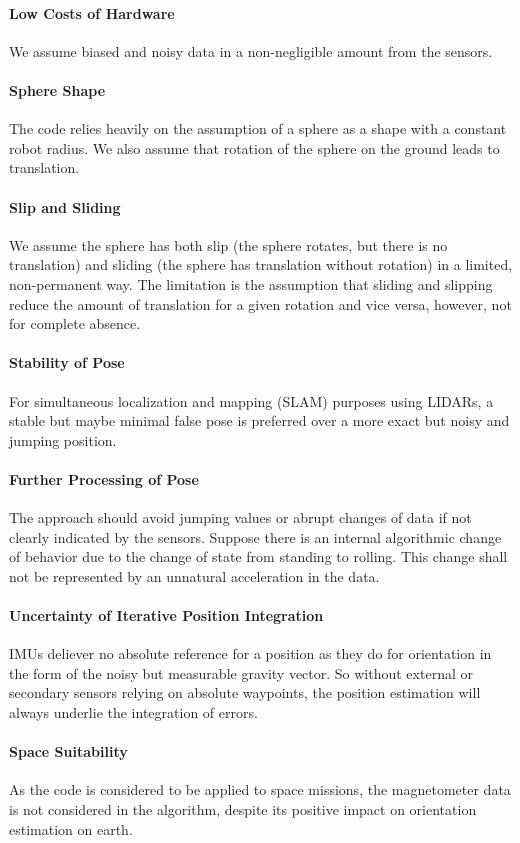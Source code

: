 \documentclass[letterpaper, 10 pt, conference]{ieeeconf}  %
\begin{document}
\paragraph*{Low Costs of Hardware}
We assume biased and noisy data in a non-negligible amount from the sensors.
\paragraph*{Sphere Shape}
The code relies heavily on the assumption of a sphere as a shape with a constant robot radius. We also assume that rotation of the sphere on the ground leads to translation.
\paragraph*{Slip and Sliding}
We assume the sphere has both slip (the sphere rotates, but there is no translation) and sliding (the sphere has translation without rotation) in a limited, non-permanent way. The limitation is the assumption that sliding and slipping reduce the amount of translation for a given rotation and vice versa, however, not for complete absence.
\paragraph*{Stability of Pose}
For simultaneous localization and mapping (SLAM) purposes using LIDARs, a stable but maybe minimal false pose is preferred over a more exact but noisy and jumping position.
\paragraph*{Further Processing of Pose}
The approach should avoid jumping values or abrupt changes of data if not clearly indicated by the sensors. Suppose there is an internal algorithmic change of behavior due to the change of state from standing to rolling. This change shall not be represented by an unnatural acceleration in the data.
\paragraph*{Uncertainty of Iterative Position Integration}
IMUs deliever no absolute reference for a position as they do for orientation in the form of the noisy but measurable gravity vector. So without external or secondary sensors relying on absolute waypoints, the position estimation will always underlie the integration of errors.
\paragraph*{Space Suitability}
As the code is considered to be applied to space missions, the magnetometer data is not considered in the algorithm, despite its positive impact on orientation estimation on earth.
\end{document}
